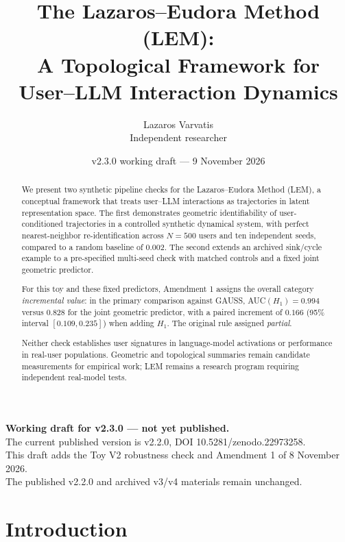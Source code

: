 \documentclass[11pt]{article}
\title{The Lazaros--Eudora Method (LEM):\\
A Topological Framework for User--LLM Interaction Dynamics}
\author{Lazaros Varvatis\\\small Independent researcher}
\date{v2.3.0 working draft --- 9 November 2026}
\begin{document}
\maketitle
\begin{center}
\small\textbf{Working draft for v2.3.0 --- not yet published.}\\
The current published version is v2.2.0, DOI 10.5281/zenodo.22973258.\\
This draft adds the Toy V2 robustness check and Amendment 1 of 8 November 2026.\\
The published v2.2.0 and archived v3/v4 materials remain unchanged.
\end{center}


\begin{abstract}
We present two synthetic pipeline checks for the Lazaros--Eudora Method (LEM),
a conceptual framework that treats user--LLM interactions as trajectories in
latent representation space. The first demonstrates geometric identifiability
of user-conditioned trajectories in a controlled synthetic dynamical system,
with perfect nearest-neighbor re-identification across $N=500$ users and ten
independent seeds, compared to a random baseline of $0.002$. The second extends
an archived sink/cycle example to a pre-specified multi-seed check with matched
controls and a fixed joint geometric predictor.

For this toy and these fixed predictors, Amendment 1 assigns the overall category
\textit{incremental value}: in the primary comparison against GAUSS,
AUC$(H_1)=0.994$ versus $0.828$ for the joint geometric predictor, with a paired
increment of $0.166$ (95\% interval $[0.109,0.235]$) when adding $H_1$.
The original rule assigned \textit{partial}.

Neither check establishes user signatures in language-model activations or
performance in real-user populations. Geometric and topological summaries remain
candidate measurements for empirical work; LEM remains a research program
requiring independent real-model tests.
\end{abstract}


\section{Introduction}
\end{document}
